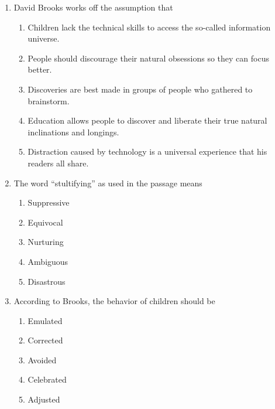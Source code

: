 \begin{enumerate}
\item David Brooks works off the assumption that
\begin{enumerate}[label=(\Alph*)]
\item Children lack the technical skills to access the so-called information universe.
\item People should discourage their natural obsessions so they can focus better.
\item Discoveries are best made in groups of people who gathered to brainstorm.
\item Education allows people to discover and liberate their true natural inclinations and longings.
\item Distraction caused by technology is a universal experience that his readers all share.
\end{enumerate}

\bigskip
\item The word “stultifying” as used in the passage means
\begin{enumerate}[label=(\Alph*)]
\item Suppressive
\item Equivocal
\item Nurturing
\item Ambiguous
\item Disastrous
\end{enumerate}

\newpage
\item According to Brooks, the behavior of children should be
\begin{enumerate}[label=(\Alph*)]
\item Emulated
\item Corrected
\item Avoided
\item Celebrated
\item Adjusted
\end{enumerate}
\end{enumerate}